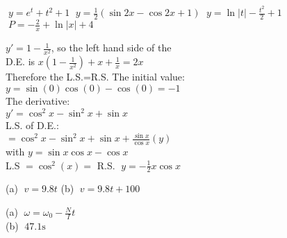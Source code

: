 \begin{Answer}[ref={exDiffEqns}]
\Question %
\begin{tasks}
	\task $\;y =e^{t} +t^{2} +1$ 
	\task $\;y =\frac{1}{2} \left (\sin  2 x -\cos  2 x +1\right )$
	\task $\;y =\ln  \left \vert t\right \vert  -\frac{t^{2}}{2} +1$ 
	\task $\;P = -\frac{2}{x} +\ln  \left \vert x\right \vert  +4$ 
\end{tasks}

\Question %
$y'=1-\frac{1}{x^2}$, so the left hand side of the \\ D.E. is $x(1-\frac{1}{x^2})+x+\frac{1}{x}=2x$ \\Therefore the L.S.=R.S.
\Question %
The initial value:\\
$y=\sin(0)\cos(0)-\cos(0)=-1$\\
The derivative:\\
$y'=\cos^2 x-\sin^2 x+\sin x$\\
L.S. of D.E.:\\
$=\cos^2 x-\sin^2 x +\sin x +\frac{\sin x}{\cos x}(y)$\\
with $y=\sin  x \cos  x -\cos  x$\\
L.S $=\cos^2(x)=$ R.S.
\Question %
$\;y = -\frac{1}{2} x \cos  x$

\Question %
(a) $\;v =9.8 t$ (b) $\;v =9.8 t +100$

\Question %
(a) $\;\omega  =\omega _{0} -\frac{N}{I} t$ \\
(b) $\;47.1 \mbox{s}$
\end{Answer}%

